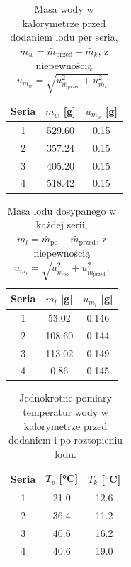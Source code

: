 \documentclass[12pt, a4paper]{article}
\begin{document}
\begin{table}[H]
\centering
\caption{Masa wody w kalorymetrze przed dodaniem lodu per seria,
         $m_w = \bar{m}_{\mathrm{przed}} - \bar{m}_k$,
         z niepewnością $u_{m_w} = \sqrt{u_{\bar{m}_{\mathrm{przed}}}^2 + u_{\bar{m}_k}^2}$.}\label{tab:qt_mw}
\begin{tabular}{c S[table-format=3.2] S[table-format=1.3]}
\toprule
Seria & {$m_w$ [\unit{\gram}]} & {$u_{m_w}$ [\unit{\gram}]} \\
 & 529.60 & 0.15 \\
2 & 357.24 & 0.15 \\
3 & 405.20 & 0.15 \\
4 & 518.42 & 0.15 \\
\bottomrule
\end{tabular}
\end{table}

\begin{table}[H]
\centering
\caption{Masa lodu dosypanego w każdej serii,
         $m_l = \bar{m}_{\mathrm{po}} - \bar{m}_{\mathrm{przed}}$,
         z niepewnością $u_{m_l} = \sqrt{u_{\bar{m}_{\mathrm{po}}}^2 + u_{\bar{m}_{\mathrm{przed}}}^2}$.}\label{tab:qt_ml}
\begin{tabular}{c S[table-format=3.2] S[table-format=1.3]}
\toprule
Seria & {$m_l$ [\unit{\gram}]} & {$u_{m_l}$ [\unit{\gram}]} \\
 &  53.02 & 0.146 \\
2 & 108.60 & 0.144 \\
3 & 113.02 & 0.149 \\
4 &   0.86 & 0.145 \\
\bottomrule
\end{tabular}
\end{table}

\begin{table}[H]
\centering
\caption{Jednokrotne pomiary temperatur wody w kalorymetrze przed dodaniem i po roztopieniu lodu.}\label{tab:qt_temp}
\begin{tabular}{c S[table-format=2.1] S[table-format=2.1]}
\toprule
Seria & {$T_p$ [\unit{\degreeCelsius}]} & {$T_k$ [\unit{\degreeCelsius}]} \\
 & 21.0 & 12.6 \\
2 & 36.4 & 11.2 \\
3 & 40.6 & 16.2 \\
4 & 40.6 & 19.0 \\
\bottomrule
\end{tabular}
\end{table}
\end{document}
